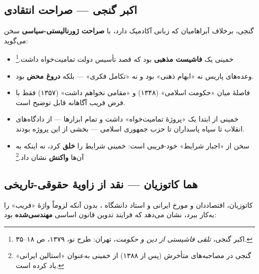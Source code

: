 \documentclass[12pt,a4paper]{book}
\newcommand{\keyword}[1]{\textbf{\textcolor{cPrimary}{#1}}}
\newcommand{\en}[1]{\lr{\textit{#1}}}
\begin{document}
\subsection{اکبر گنجی — صراحت انتقادی}

گنجی، برخلاف آبراهامیان که زبانی آکادمیک دارد، با \keyword{صراحت ژورنالیستی-سیاسی} سخن می‌گوید:

\begin{warningBox}
\begin{itemize}[label=\textcolor{cAccent}{$\bullet$}, rightmargin=2em]
    \item خمینی یک \keyword{فاشیست مذهبی} بود که قصد تأسیس دولت تمامیت‌خواه داشت.\footnote{اکبر گنجی، \textit{تلقی فاشیستی از دین و حکومت}، تهران: طرح نو، ۱۳۷۹، ص ۱۸–۳۵.}
    \item وعده‌های پاریس نه «ابهام ذهنی» بود و نه «تکامل فکری» — بلکه \keyword{دروغ محض} بود.
    \item فاصلهٔ میان «حکومت اسلامی» (۱۳۴۸) و «مقامی نخواهم داشت» (۱۳۵۷) فقط با فرض فریب آگاهانه قابل توضیح است.
    \item خمینی از ابتدا یک «پروژهٔ تمامیت‌خواه» داشت و تمام ابزارها — از دادگاه‌های انقلاب تا سپاه پاسداران تا حزب جمهوری اسلامی — بخشی از این پروژه بودند.
    \item سخن از «اجبار شرایط» خود-فریبی است: خمینی شرایط را \keyword{خلق} کرد، نه اینکه به آن‌ها \keyword{واکنش} نشان داد.\footnote{گنجی در مصاحبه‌های متأخرش (پس از ۱۳۸۸) از خمینی به‌عنوان «استالین ایرانی» یاد کرده است.}
\end{itemize}
\end{warningBox}

\subsection{هما کاتوزیان — نقد از زاویهٔ حقوقی-تاریخی}

کاتوزیان، اقتصاددان و مورخ ایرانی و استاد دانشگاه \en{Oxford}، بدون آنکه لزوماً واژهٔ «فریب» را به‌کار ببرد، نشان می‌دهد که فرایند تدوین قانون اساسی \keyword{مهندسی‌شده} بود:
\end{document}
